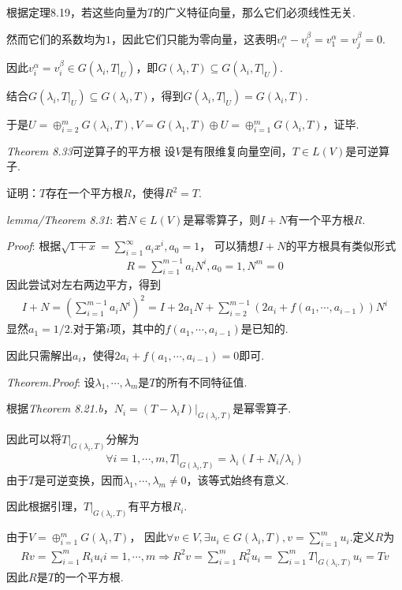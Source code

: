 根据定理8.19，若这些向量为$T$的广义特征向量，那么它们必须线性无关.

然而它们的系数均为$1$，因此它们只能为零向量，这表明$v_i^\alpha-v_i^\beta=v_1^\alpha=v_j^\beta=0$.

因此$v_i^\alpha=v_i^\beta \in G(\lambda_i,T|_U)$，即$G(\lambda_i,T) \subseteq G(\lambda_i,T|_U)$.

结合$G(\lambda_i,T|_U) \subseteq G(\lambda_i,T)$，得到$G(\lambda_i,T|_U)=G(\lambda_i,T)$.

于是$U=\oplus_{i=2}^m G(\lambda_i,T),V=G(\lambda_1,T) \oplus U=\oplus_{i=1}^m G(\lambda_i,T)$，证毕.

\newpage

\textit{Theorem 8.33}{\kaishu 可逆算子的平方根}
设$V$是有限维复向量空间，$T \in L(V)$是可逆算子.

证明：$T$存在一个平方根$R$，使得$R^2=T$.

\textit{lemma/Theorem 8.31}:
若$N \in L(V)$是幂零算子，则$I+N$有一个平方根$R$.

\textit{Proof}:
根据$\sqrt{1+x}=\sum_{i=1}^\infty a_ix^i,a_0=1$，
可以猜想$I+N$的平方根具有类似形式
    \begin{align*}
        R=\sum_{i=1}^{m-1} a_iN^i,a_0=1,N^m=0
    \end{align*}
因此尝试对左右两边平方，得到
    \begin{align*}
        I+N = (\sum_{i=1}^{m-1} a_iN^i)^2 
            = I+2a_1N+\sum_{i=2}^{m-1} (2a_i+f(a_1,\cdots,a_{i-1}))N^i
    \end{align*}
显然$a_1=1/2$.对于第$i$项，其中的$f(a_1,\cdots,a_{i-1})$是已知的.

因此只需解出$a_i$，使得$2a_i+f(a_1,\cdots,a_{i-1})=0$即可.

\textit{Theorem.Proof}:
设$\lambda_1,\cdots,\lambda_m$是$T$的所有不同特征值.

根据\textit{Theorem 8.21.b}，$N_i=(T-\lambda_i I)|_{G(\lambda_i,T)}$是幂零算子.

因此可以将$T|_{G(\lambda_i,T)}$分解为
    \begin{align*}
        \forall i=1,\cdots,m,T|_{G(\lambda_i,T)}=\lambda_i(I+N_i/\lambda_i)
    \end{align*}
由于$T$是可逆变换，因而$\lambda_1,\cdots,\lambda_m \ne 0$，该等式始终有意义.

因此根据引理，$T|_{G(\lambda_i,T)}$有平方根$R_i$.

由于$V=\oplus_{i=1}^m G(\lambda_i,T)$，
因此$\forall v \in V,\exists u_i \in G(\lambda_i,T),v=\sum_{i=1}^m u_i$.定义$R$为
    \begin{align*}
        Rv=\sum_{i=1}^m R_iu_i i=1,\cdots,m \Rightarrow
        R^2v=\sum_{i=1}^m R_i^2 u_i=\sum_{i=1}^m T|_{G(\lambda_i,T)}u_i=Tv
    \end{align*}
因此$R$是$T$的一个平方根.

